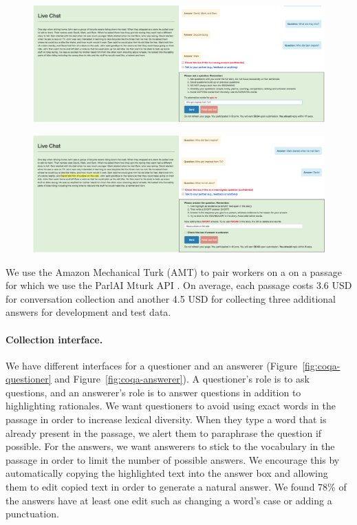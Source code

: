 \begin{figure}[!t]
  \center
  \includegraphics[scale=0.18]{img/coqa_questioner.png}
\end{figure}

\begin{figure}[!t]
  \center
  \includegraphics[scale=0.18]{img/coqa_answerer.png}
\end{figure}

We use the Amazon Mechanical Turk (AMT) to pair workers on a on a passage for which we use the ParlAI Mturk API \cite{miller2017parlai}. On average, each passage costs 3.6 USD for conversation collection and another 4.5 USD for collecting three additional answers for development and test data.


\paragraph{Collection interface.} We have different interfaces for a questioner and an answerer (Figure~\ref{fig:coqa-questioner} and Figure~\ref{fig:coqa-answerer}). A questioner's role is to ask questions, and an answerer's role is to answer questions in addition to highlighting rationales. We want questioners to avoid using exact words in the passage in order to increase lexical diversity. When they type a word that is already present in the passage, we alert them to paraphrase the question if possible. For the answers, we want answerers to stick to the vocabulary in the passage in order to limit the number of possible answers. We encourage this by automatically copying the highlighted text into the answer box and allowing them to edit copied text in order to generate a natural answer. We found 78\% of the answers have at least one edit such as changing a word's case or adding a punctuation.

